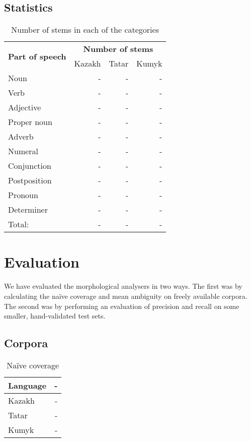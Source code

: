 \documentclass[a4paper,11pt,twocolumn]{article}
\begin{document}
\subsection{Statistics}

\begin{table}
\begin{center}
\begin{tabular}{|l|rrr|}
		\hline
\multirow{2}{*}{\textbf{Part of speech}} & \multicolumn{3}{|c|}{\textbf{Number of stems}} \\ \cline{2-4}
                        & Kazakh & Tatar & Kumyk \\
		\hline
		Noun & - & - & - \\
		Verb & - & - & - \\
		Adjective & - & - & - \\
		Proper noun & - & - & - \\
		Adverb & - & - & - \\
		Numeral & - & - & - \\
		Conjunction & - & - & - \\
		Postposition & - & - & - \\
		Pronoun & - & - & - \\
		Determiner & - & - & - \\
		\hline
		Total: & - & - & - \\
		\hline
\end{tabular}
 \caption{Number of stems in each of the categories}
 \label{table:coverage}
\end{center}

\end{table}

\section{Evaluation}

We have evaluated the morphological analysers in two ways. The first was by calculating the naïve coverage and mean ambiguity 
on freely available corpora. The second was by performing an evaluation of precision and recall on some 
smaller, hand-validated test sets.

\subsection{Corpora}

\begin{table}
\begin{center}
\begin{tabular}{lr}
\textbf{Language} & - \\
\hline
Kazakh & - \\
Tatar & - \\
Kumyk & - \\
\hline
\end{tabular}
 \caption{Naïve coverage}
 \label{table:coverage}
\end{center}
\end{table}
\end{document}
